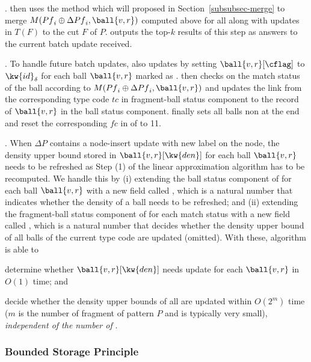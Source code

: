 \stab
{}. \patinc then uses the method which will proposed in Section~\ref{subsubsec-merge} to merge $M({Pf}_i\oplus \Delta {Pf}_i, \ball{v,r})$ computed above for all \affballsx along with updates in $T(F)$ to the cut $F$ of $P$. \patinc outputs the top-$k$ results of this step as answers to the current batch update received.

\stab
{}. To handle future batch updates, \patinc also updates \matchindex by setting $\ball{v,r}[\cflag]$ to $\kw{id}_\delta$ for each ball $\ball{v,r}$ marked as \affballx. \patinc then checks on the match status of the ball according to $M({Pf}_i\oplus \Delta {Pf}_i, \ball{v,r})$ and updates the link from the corresponding type code $tc$ in fragment-ball status component to the record of $\ball{v,r}$ in the ball status component. \patinc finally sets all balls non \affballsx at the end and reset the corresponding $fc$ in \ballfilter of \affballsx to 11.


. When $\Delta P$ contains a node-insert update with new label on the node, the density upper bound stored in $\ball{v,r}[\kw{den}]$ for each ball $\ball{v,r}$ needs to be refreshed as Step (1) of the linear approximation algorithm has to be recomputed. We handle this by
(i) extending the ball status component of \matchindex for each ball $\ball{v,r}$ with a new field called \dflag, which is a natural number that indicates whether the density of a ball needs to be refreshed; and
(ii) extending the fragment-ball status component of \matchindex for each match status with a new field called \rflag, which is a natural number that decides whether the density upper bound of all balls of the current type code are updated (omitted).
With these, algorithm \optpatinc is able to
\bi
\item [(a)] determine whether $\ball{v,r}[\kw{den}]$ needs update for each \affballx $\ball{v,r}$ in $O(1)$ time; and
\item [(b)] decide whether the density upper bounds of all \affballsx are updated within $O(2^m)$ time ($m$ is the number of fragment of pattern $P$ and is typically very small), {\em independent of the number of \affballsx}.
\ei


\subsubsection{Bounded Storage Principle}


